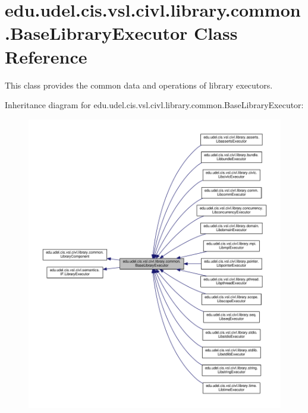 \hypertarget{classedu_1_1udel_1_1cis_1_1vsl_1_1civl_1_1library_1_1common_1_1BaseLibraryExecutor}{}\section{edu.\+udel.\+cis.\+vsl.\+civl.\+library.\+common.\+Base\+Library\+Executor Class Reference}
\label{classedu_1_1udel_1_1cis_1_1vsl_1_1civl_1_1library_1_1common_1_1BaseLibraryExecutor}


This class provides the common data and operations of library executors.  




Inheritance diagram for edu.\+udel.\+cis.\+vsl.\+civl.\+library.\+common.\+Base\+Library\+Executor\+:
\nopagebreak
\begin{figure}[H]
\begin{center}
\leavevmode
\includegraphics[width=350pt]{classedu_1_1udel_1_1cis_1_1vsl_1_1civl_1_1library_1_1common_1_1BaseLibraryExecutor__inherit__graph}
\end{center}
\end{figure}


